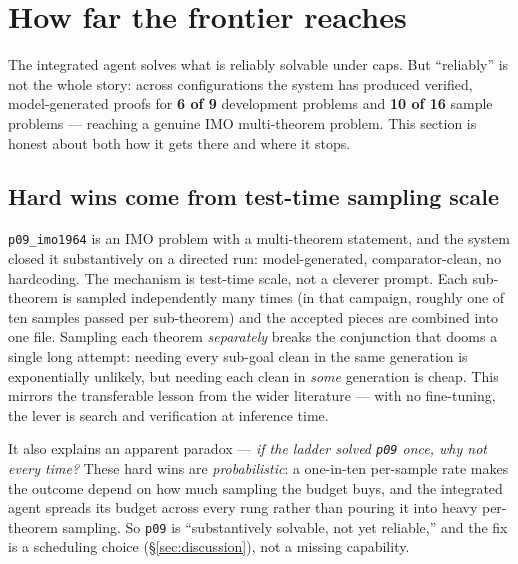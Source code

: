 \section{How far the frontier reaches}
\label{sec:frontier}

The integrated agent solves what is reliably solvable under caps. But ``reliably''
is not the whole story: across configurations the system has produced verified,
model-generated proofs for \textbf{6 of 9} development problems and \textbf{10 of
16} sample problems --- reaching a genuine IMO multi-theorem problem. This section
is honest about both how it gets there and where it stops.

\subsection{Hard wins come from test-time sampling scale}
\texttt{p09\_imo1964} is an IMO problem with a multi-theorem statement, and the
system closed it substantively on a directed run: model-generated,
comparator-clean, no hardcoding. The mechanism is test-time scale, not a cleverer
prompt. Each sub-theorem is sampled independently many times (in that campaign,
roughly one of ten samples passed per sub-theorem) and the accepted pieces are
combined into one file.
Sampling each theorem \emph{separately} breaks the conjunction that dooms a single
long attempt: needing every sub-goal clean in the same generation is
exponentially unlikely, but needing each clean in \emph{some} generation is
cheap. This mirrors the transferable lesson from the wider literature --- with no
fine-tuning, the lever is search and verification at inference time.

It also explains an apparent paradox --- \emph{if the ladder solved \texttt{p09}
once, why not every time?} These hard wins are \emph{probabilistic}: a one-in-ten
per-sample rate makes the outcome depend on how much sampling the budget buys, and
the integrated agent spreads its budget across every rung rather than pouring it
into heavy per-theorem sampling. So \texttt{p09} is ``substantively solvable, not
yet reliable,'' and the fix is a scheduling choice (\S\ref{sec:discussion}), not a
missing capability.

